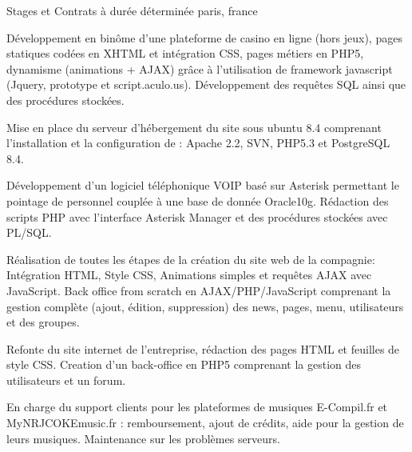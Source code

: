 \cventry
{} %
{Stages et Contrats à durée déterminée} %
{paris, france} %
{} %
{
\begin{cvsubentries}
    \begin{cvitems} %
        \item
        {
            Développement en binôme d’une plateforme de casino en ligne (hors jeux),
            pages statiques codées en XHTML et intégration CSS, pages métiers en PHP5, dynamisme
            (animations + AJAX) grâce à l’utilisation de framework javascript (Jquery, prototype et script.aculo.us).
            Développement des requêtes SQL ainsi que des procédures stockées.
        }
        \item
        {
            Mise en place du serveur d'hébergement du site sous ubuntu 8.4 comprenant l'installation et la
            configuration de : Apache 2.2, SVN, PHP5.3 et PostgreSQL 8.4.
        }
    \end{cvitems}
    \begin{cvitems} %
        \item
        {
            Développement d’un logiciel téléphonique VOIP basé sur Asterisk
            permettant le pointage de personnel couplée à une base de donnée Oracle10g.
            Rédaction des scripts PHP avec l'interface Asterisk Manager et des procédures stockées avec PL/SQL.
        }
        \item
        {
            Réalisation de toutes les étapes de la création du site web de la compagnie:
            Intégration HTML, Style CSS, Animations simples et requêtes AJAX avec JavaScript.
            Back office from scratch en AJAX/PHP/JavaScript comprenant la gestion complète (ajout,
            édition, suppression) des news, pages, menu, utilisateurs et des groupes.
        }
    \end{cvitems}
    \begin{cvitems} %
        \item
        {
            Refonte du site internet de l'entreprise, rédaction des pages HTML et feuilles de style CSS.
            Creation d'un back-office en PHP5 comprenant la gestion des utilisateurs et un forum.
        }
    \end{cvitems}
    \begin{cvitems} %
        \item
        {
            En charge du support clients pour les plateformes de musiques E-Compil.fr et 
            MyNRJCOKEmusic.fr : remboursement, ajout de crédits, aide pour la gestion de leurs musiques.
            Maintenance sur les problèmes serveurs.
        }
    \end{cvitems}
\end{cvsubentries}
}
